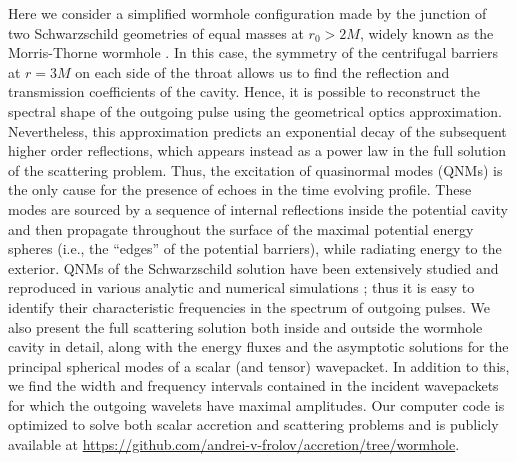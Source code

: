\documentclass[article,aps,nofootinbib,twocolumn,superscriptaddress]{revtex4-1}
\begin{document}
Here we consider a simplified wormhole configuration made by the junction of two Schwarzschild geometries of equal masses at $r_0>2M$, widely known as the Morris-Thorne wormhole \citep{Cardoso:2016oxy, doi:10.1119/1.15620}. In this case, the symmetry of the centrifugal barriers at $r=3M$ on each side of the throat allows us to find the reflection and transmission coefficients of the cavity. Hence, it is possible to reconstruct the spectral shape of the outgoing pulse using the geometrical optics approximation. Nevertheless, this approximation predicts an exponential decay of the subsequent higher order reflections, which appears instead as a power law in the full solution of the scattering problem. Thus, the excitation of quasinormal modes (QNMs) is the only cause for the presence of echoes in the time evolving profile. These modes are sourced by a sequence of internal reflections inside the potential cavity and then propagate throughout the surface of the maximal potential energy spheres (i.e., the ``edges'' of the potential barriers), while radiating energy to the exterior. QNMs of the Schwarzschild solution have been extensively studied and reproduced in various analytic and numerical simulations \citep{Chandrasekhar:1975zza, PhysRevD.46.4179}; thus it is easy to identify their characteristic frequencies in the spectrum of outgoing pulses. We also present the full scattering solution both inside and outside the wormhole cavity in detail, along with the energy fluxes and the asymptotic solutions for the principal spherical modes of a scalar (and tensor) wavepacket. In addition to this, we find the width and frequency intervals contained in the incident wavepackets for which the outgoing wavelets have maximal amplitudes. Our computer code is optimized to solve both scalar accretion and scattering problems and is publicly available at \url{https://github.com/andrei-v-frolov/accretion/tree/wormhole}.
\end{document}
